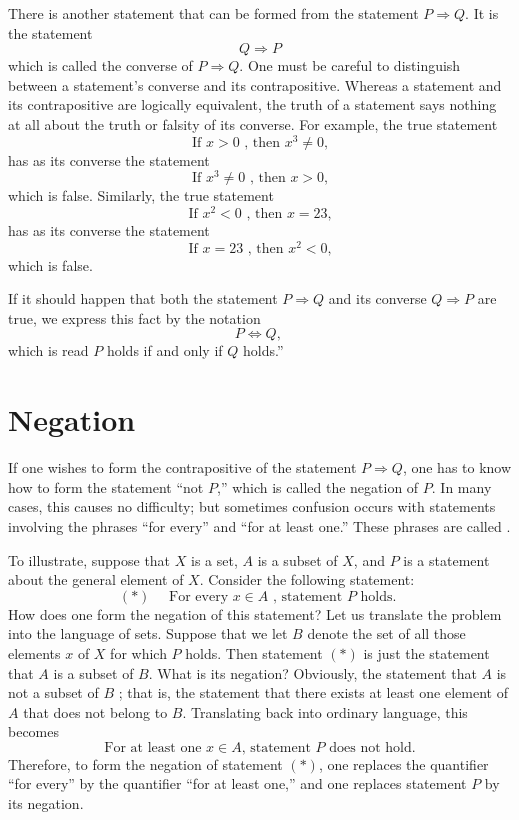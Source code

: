 There is another statement that can be formed from the statement \(P \Rightarrow Q\). It is the statement
\[
Q \Rightarrow P
\]
which is called the converse of \(P \Rightarrow Q\). One must be careful to distinguish 
between a statement's converse and its contrapositive. Whereas a statement and its contrapositive 
are logically equivalent, the truth of a statement says nothing at all about the truth or falsity 
of its converse. For example, the true statement
\[
\text{ If }x > 0\text{ , then }x^{3} \neq 0\text{, }
\]
has as its converse the statement
\[
\text{ If }x^{3} \neq 0\text{ , then }x > 0\text{, }
\]
which is false. Similarly, the true statement
\[
\text{ If }x^{2} < 0\text{ , then }x = {23}\text{, }
\]
has as its converse the statement
\[
\text{ If }x = {23}\text{ , then }x^{2} < 0\text{, }
\]
which is false.

If it should happen that both the statement \(P \Rightarrow Q\) and its converse 
\(Q \Rightarrow P\) are true, we express this fact by the notation
\[
P \Leftrightarrow Q\text{, }
\]
which is read \(P\) holds if and only if \(Q\) holds.''

\section*{Negation}

If one wishes to form the contrapositive of the statement \(P \Rightarrow Q\), one has 
to know how to form the statement ``not \(P\),'' which is called the negation of \(P\). 
In many cases, this causes no difficulty; but sometimes confusion occurs with statements involving 
the phrases ``for every'' and ``for at least one.'' These phrases are called .

To illustrate, suppose that \(X\) is a set, \(A\) is a subset of \(X\), and \(P\) is a 
statement about the general element of \(X\). Consider the following statement:
\[
(*) \hspace{1em} \text{ For every }x \in A\text{ , statement }P\text{ holds. }
\]
How does one form the negation of this statement? Let us translate the problem into the language 
of sets. Suppose that we let \(B\) denote the set of all those elements \(x\) of \(X\) for which 
\(P\) holds. Then statement \((*)\) is just the statement that \(A\) is a subset of \(B\). 
What is its negation? Obviously, the statement that \(A\) is not a subset of \(B\) ; that is, 
the statement that there exists at least one element of \(A\) that does not belong to \(B\). 
Translating back into ordinary language, this becomes
\[
\text{For at least one } x \in A \text{, statement } P \text{ does not hold.}
\]
Therefore, to form the negation of statement \((*)\), one replaces the quantifier ``for every'' 
by the quantifier ``for at least one,'' and one replaces statement \(P\) by its negation.

